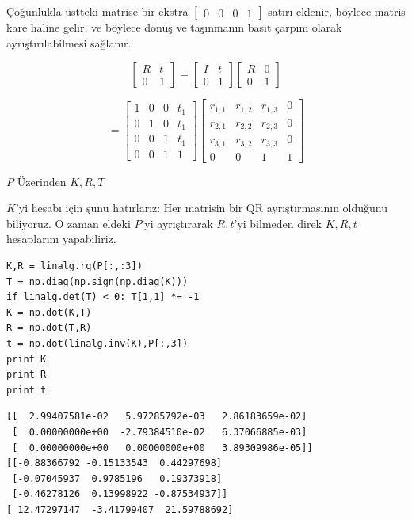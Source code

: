 \documentclass[12pt,fleqn]{article}\usepackage{../../common}
\begin{document}
Çoğunlukla üstteki matrise bir ekstra
$\left[\begin{array}{cccc}0&0&0&1\end{array}\right]$ satırı eklenir, 
böylece matris kare haline gelir, ve böylece dönüş ve taşınmanın basit
çarpım olarak ayrıştırılabilmesi sağlanır. 

$$ 
\left[\begin{array}{c|c} 
R & t \\  \hline 0 & 1
\end{array}\right] =
\left[\begin{array}{c|c} 
I & t \\  \hline 0 & 1
\end{array}\right]
\left[\begin{array}{c|c} 
R & 0 \\  \hline 0 & 1
\end{array}\right]
$$

$$ 
= \left[\begin{array}{ccc|c}
1 & 0 & 0 & t_1 \\
0 & 1 & 0 & t_1 \\
0 & 0 & 1 & t_1  \\
\hline
0 & 0 & 1 & 1
\end{array}\right]
\left[\begin{array}{ccc|c}
r_{1,1} & r_{1,2} & r_{1,3} & 0 \\
r_{2,1} & r_{2,2} & r_{2,3} & 0 \\
r_{3,1} & r_{3,2} & r_{3,3} & 0 \\
\hline
0 & 0 & 1 & 1
\end{array}\right]
$$

$P$ Üzerinden $K,R,T$

$K$'yi hesabı için şunu hatırlarız: Her matrisin bir QR ayrıştırmasının
olduğunu biliyoruz. O zaman eldeki $P$'yi ayrıştırarak $R,t$'yi bilmeden
direk $K,R,t$ hesaplarını yapabiliriz.

\begin{verbatim}
K,R = linalg.rq(P[:,:3])
T = np.diag(np.sign(np.diag(K)))
if linalg.det(T) < 0: T[1,1] *= -1
K = np.dot(K,T)
R = np.dot(T,R) 
t = np.dot(linalg.inv(K),P[:,3])
print K
print R
print t
\end{verbatim}

\begin{verbatim}
[[  2.99407581e-02   5.97285792e-03   2.86183659e-02]
 [  0.00000000e+00  -2.79384510e-02   6.37066885e-03]
 [  0.00000000e+00   0.00000000e+00   3.89309986e-05]]
[[-0.88366792 -0.15133543  0.44297698]
 [-0.07045937  0.9785196   0.19373918]
 [-0.46278126  0.13998922 -0.87534937]]
[ 12.47297147  -3.41799407  21.59788692]
\end{verbatim}
\end{document}
